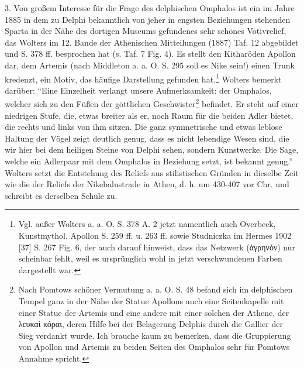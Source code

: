 \documentclass[a4paper, 11pt, oneside]{article}
\begin{document}
3. Von großem Interesse für die Frage des delphischen Omphalos ist ein im Jahre 1885 in dem zu Delphi bekanntlich von jeher in engsten Beziehungen stehenden Sparta in der Nähe des dortigen Museums gefundenes sehr schönes Votivrelief, das Wolters im 12. Bande der Athenischen Mitteilungen (1887) Taf. 12 abgebildet und S. 378 ff. besprochen hat (s. Taf. 7 Fig. 4). Es stellt den Kitharöden Apollon dar, dem Artemis (nach Middleton a. a. O. S. 295 soll es Nike sein!) einen Trunk kredenzt, ein Motiv, das häufige Darstellung gefunden hat.\footnote{Vgl. außer Wolters a. a. O. S. 378 A. 2 jetzt namentlich auch Overbeck, Kunstmythol. Apollon S. 259 ff. u. 263 ff. sowie Studniczka im Hermes 1902 [37] S. 267 Fig. 6, der auch darauf hinweist, dass das Netzwerk (ἀγρηνόν) nur scheinbar fehlt, weil es ursprünglich wohl in jetzt verschwundenen Farben dargestellt war.} Wolters bemerkt darüber: "`Eine Einzelheit verlangt unsere Aufmerksamkeit: der Omphalos, welcher sich zu den Füßen der göttlichen Geschwister\footnote{Nach Pomtows schöner Vermutung a. a. O. S. 48 befand sich im delphischen Tempel ganz in der Nähe der Statue Apollons auch eine Seitenkapelle mit einer Statue der Artemis und eine andere mit einer solchen der Athene, der λευκαὶ κόραι, deren Hilfe bei der Belagerung Delphis durch die Gallier der Sieg verdankt wurde. Ich brauche kaum zu bemerken, dass die Gruppierung von Apollon und Artemis zu beiden Seiten des Omphalos sehr für Pomtows Annahme spricht.} befindet. Er steht auf einer niedrigen Stufe, die, etwas breiter als er, noch Raum für die beiden Adler bietet, die rechts und links von ihm sitzen. Die ganz symmetrische und etwas leblose Haltung der Vögel zeigt deutlich genug, dass es nicht lebendige Wesen sind, die wir hier bei dem heiligen Steine von Delphi sehen, sondern Kunstwerke. Die Sage, welche ein Adlerpaar mit dem Omphalos in Beziehung setzt, ist bekannt genug."' Wolters setzt die Entstehung des Reliefs aus stilistischen Gründen in dieselbe Zeit wie die der Reliefs der Nikebalustrade in Athen, d. h. um 430-407 vor Chr. und schreibt es derselben Schule zu.
\end{document}
